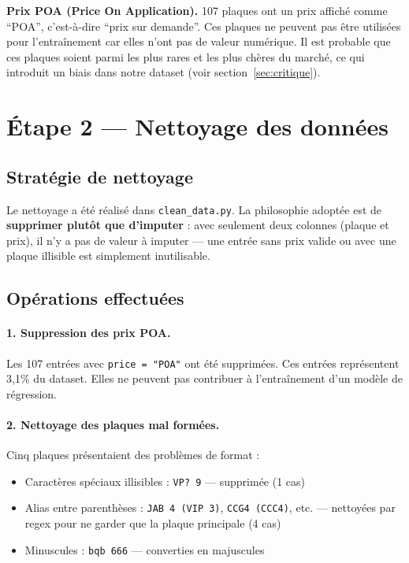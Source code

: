 \documentclass[12pt, a4paper]{article}
\begin{document}
\textbf{Prix POA (Price On Application).} 107 plaques ont un prix affiché comme ``POA'', c'est-à-dire ``prix sur demande''. Ces plaques ne peuvent pas être utilisées pour l'entraînement car elles n'ont pas de valeur numérique. Il est probable que ces plaques soient parmi les plus rares et les plus chères du marché, ce qui introduit un biais dans notre dataset (voir section~\ref{sec:critique}).

\section{Étape 2 — Nettoyage des données}

\subsection{Stratégie de nettoyage}

Le nettoyage a été réalisé dans \texttt{clean\_data.py}. La philosophie adoptée est de \textbf{supprimer plutôt que d'imputer} : avec seulement deux colonnes (plaque et prix), il n'y a pas de valeur à imputer — une entrée sans prix valide ou avec une plaque illisible est simplement inutilisable.

\subsection{Opérations effectuées}

\paragraph{1. Suppression des prix POA.}
Les 107 entrées avec \texttt{price = "POA"} ont été supprimées. Ces entrées représentent 3,1\% du dataset. Elles ne peuvent pas contribuer à l'entraînement d'un modèle de régression.

\paragraph{2. Nettoyage des plaques mal formées.}
Cinq plaques présentaient des problèmes de format :
\begin{itemize}
  \item Caractères spéciaux illisibles : \texttt{VP? 9} — supprimée (1 cas)
  \item Alias entre parenthèses : \texttt{JAB 4 (VIP 3)}, \texttt{CCG4 (CCC4)}, etc. — nettoyées par regex pour ne garder que la plaque principale (4 cas)
  \item Minuscules : \texttt{bqb 666} — converties en majuscules
\end{itemize}
\end{document}
